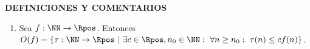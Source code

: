 
\begin{center}
    \textbf{\large DEFINICIONES Y COMENTARIOS}
\end{center}

\bigskip
\bigskip
\bigskip

\begin{enumerate}
	\item Sea $f: \NN \to \Rpos$. Entonces $O(f) = \{\tau : \NN \to \Rpos \ | \ 
		\exists c \in \Rpos, n_0 \in \NN : \ 
		\forall n \geq n_0 : \ \tau(n) \leq c f(n)\}$.
\end{enumerate}
